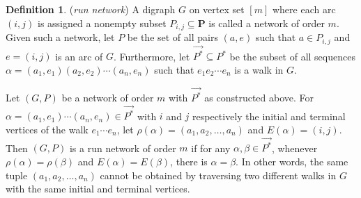 \documentclass[11pt,reqno]{amsart}
\numberwithin{equation}{section}
\theoremstyle{plain}
\theoremstyle{definition}
\newtheorem{Def}[theorem]{Definition}
\begin{document}
\begin{Def}{(\emph{run network})} A digraph $G$ on vertex set $[m]$ where each arc $(i, j)$ is assigned a nonempty subset $P_{i, j} \subseteq \mathbf{P}$ is called a network of order $m$. Given such a network, let $P$ be the set of all pairs $(a, e)$ such that $a \in P_{i, j}$ and $e=(i, j)$ is an arc of $G$. Furthermore, let $\overrightarrow{P^*} \subseteq P^*$ be the subset of all sequences $\alpha=\left(a_1, e_1\right)\left(a_2, e_2\right) \cdots\left(a_n, e_n\right)$ such that $e_1 e_2 \cdots e_n$ is a walk in $G$.

Let $(G, P)$ be a network of order $m$ with $\overrightarrow{P^*}$ as constructed above. For $\alpha=\left(a_1, e_1\right) \cdots\left(a_n, e_n\right) \in \overrightarrow{P^*}$ with $i$ and $j$ respectively the initial and terminal vertices of the walk $e_1 \cdots e_n$, let $\rho(\alpha)=\left(a_1, a_2, \ldots, a_n\right)$ and $E(\alpha)=(i, j)$. Then $(G, P)$ is a run network of order $m$ if for any $\alpha, \beta \in \overrightarrow{P^*}$, whenever $\rho(\alpha)=\rho(\beta)$ and $E(\alpha)=E(\beta)$, there is $\alpha=\beta$. In other words, the same tuple $\left(a_1, a_2, \ldots, a_n\right)$ cannot be obtained by traversing two different walks in $G$ with the same initial and terminal vertices.
\end{Def}
\end{document}
